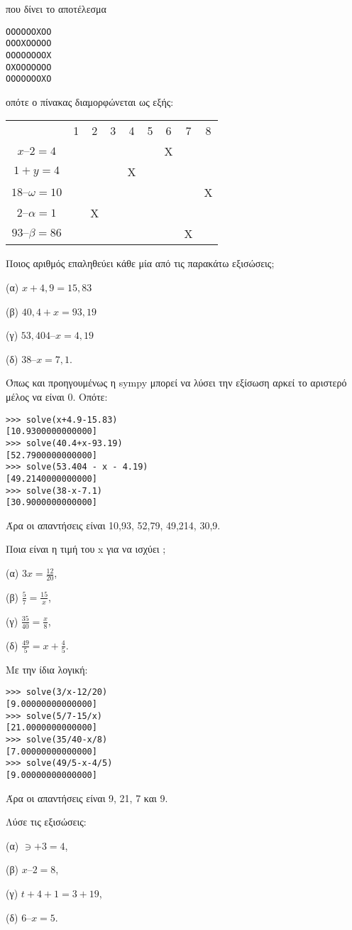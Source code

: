 που δίνει το αποτέλεσμα
\begin{lstlisting}
OOOOOOXOO
OOOXOOOOO
OOOOOOOOX
OXOOOOOOO
OOOOOOOXO
\end{lstlisting}
οπότε ο πίνακας διαμορφώνεται ως εξής:
\begin{tabular}{|c|c|c|c|c|c|c|c|c|}
&1&2&3&4&5&6&7&8\\
$x – 2 = 4$&&&&&&Χ&&\\
$1 + y = 4$&&&&Χ&&&&\\
$18 – \omega = 10$&&&&&&&&Χ\\
$2 – \alpha = 1$&&Χ&&&&&&\\
$93 – \beta = 86$&&&&&&&Χ&\\
\end{tabular}
\begin{exercise}
Ποιος αριθμός επαληθεύει κάθε μία από τις παρακάτω εξισώσεις;

(α) $x + 4,9 = 15,83$ 

(β) $40,4 + x = 93,19$ 

(γ) $53,404 – x = 4,19$ 

(δ) $38 – x = 7,1$.
\end{exercise}
Όπως και προηγουμένως η sympy μπορεί να λύσει την εξίσωση αρκεί το αριστερό μέλος να είναι 0. Οπότε:
\begin{lstlisting}
>>> solve(x+4.9-15.83)
[10.9300000000000]
>>> solve(40.4+x-93.19)
[52.7900000000000]
>>> solve(53.404 - x - 4.19)
[49.2140000000000]
>>> solve(38-x-7.1)
[30.9000000000000]
\end{lstlisting}
Άρα οι απαντήσεις είναι 10,93, 52,79, 49,214, 30,9.

\begin{exercise}
Ποια είναι η τιμή του x για να ισχύει ; 

(α) $3x = \frac{12}{20}$,

(β) $\frac{5}{7}=\frac{15}{x}$,

(γ) $\frac{35}{40} = \frac{x}{8}$,

(δ) $\frac{49}{5} = x + \frac{4}{5}$.
\end{exercise}

Με την ίδια λογική:

\begin{lstlisting}
>>> solve(3/x-12/20)
[9.00000000000000]
>>> solve(5/7-15/x)
[21.0000000000000]
>>> solve(35/40-x/8)
[7.00000000000000]
>>> solve(49/5-x-4/5)
[9.00000000000000]
\end{lstlisting}
Άρα οι απαντήσεις είναι 9, 21, 7 και 9.

\begin{exercise}
Λύσε τις εξισώσεις: 

(α) $\ni+3=4$, 

(β) $x – 2=8$, 

(γ) $t+4+1=3+19$,

(δ) $6 – x=5$.
\end{exercise}

